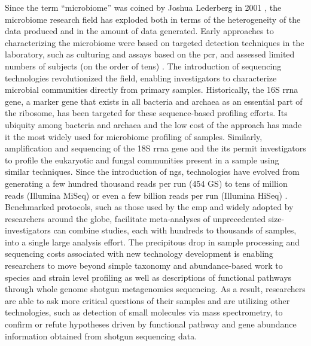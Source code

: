 Since the term ``microbiome'' was coined by Joshua Lederberg in 2001 \cite{Lederberg2001},
the microbiome research field has exploded both in terms of the heterogeneity of the
data produced and in the amount of data generated. Early approaches to characterizing
the microbiome were based on targeted detection techniques in the laboratory, such as
culturing and assays based on the \gls{pcr}, and assessed limited numbers of subjects
(on the order of tens) \cite{Brigidi2001}. The introduction of sequencing technologies
revolutionized the field, enabling investigators to characterize microbial communities
directly from primary samples. Historically, the 16S \gls{rrna} gene, a marker gene that
exists in all bacteria and archaea as an essential part of the ribosome, has been targeted
for these sequence-based profiling efforts. Its ubiquity among bacteria and archaea and
the low cost of the approach has made it the most widely used for microbiome profiling
of samples. Similarly, amplification and sequencing of the 18S \gls{rrna} gene and the
\gls{its} permit investigators to profile the eukaryotic and fungal communities present
in a sample using similar techniques. Since the introduction of \gls{ngs}, technologies
have evolved from generating a few hundred thousand reads per run (454 GS) to tens of
million reads (Illumina MiSeq) or even a few billion reads per run (Illumina HiSeq)
\cite{Goodwin2016}. Benchmarked protocols, such as those used by the \gls{emp} and
widely adopted by researchers around the globe, facilitate meta-analyses of unprecedented
size-investigators can combine studies, each with hundreds to thousands of samples,
into a single large analysis effort.
The precipitous drop in sample processing and sequencing costs associated with new
technology development is enabling researchers to move beyond simple taxonomy and
abundance-based work to species and strain level profiling as well as descriptions
of functional pathways through whole genome shotgun metagenomics sequencing. As a
result, researchers are able to ask more critical questions of their samples and
are utilizing other technologies, such as detection of small molecules via mass
spectrometry, to confirm or refute hypotheses driven by functional pathway and gene
abundance information obtained from shotgun sequencing data.

